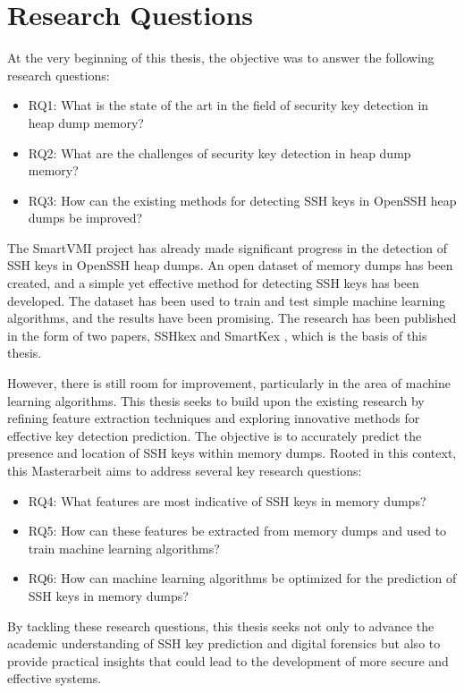 \section{Research Questions}


At the very beginning of this thesis, the objective was to answer the following research questions:
\begin{itemize}
	\item RQ1: What is the state of the art in the field of security key detection in heap dump memory?
	\item RQ2: What are the challenges of security key detection in heap dump memory?
	\item RQ3: How can the existing methods for detecting SSH keys in OpenSSH heap dumps be improved?
\end{itemize}

The SmartVMI project has already made significant progress in the detection of SSH keys in OpenSSH heap dumps. An open dataset of memory dumps has been created, and a simple yet effective method for detecting SSH keys has been developed. The dataset has been used to train and test simple machine learning algorithms, and the results have been promising. The research has been published in the form of two papers, SSHkex \cite{SSHkex22} and SmartKex \cite{SmartKex22}, which is the basis of this thesis. 

However, there is still room for improvement, particularly in the area of machine learning algorithms. This thesis seeks to build upon the existing research by refining feature extraction techniques and exploring innovative methods for effective key detection prediction. The objective is to accurately predict the presence and location of SSH keys within memory dumps. Rooted in this context, this Masterarbeit aims to address several key research questions:

\begin{itemize}
	\item RQ4: What features are most indicative of SSH keys in memory dumps?
	\item RQ5: How can these features be extracted from memory dumps and used to train machine learning algorithms?
	\item RQ6: How can machine learning algorithms be optimized for the prediction of SSH keys in memory dumps? 
\end{itemize}

By tackling these research questions, this thesis seeks not only to advance the academic understanding of SSH key prediction and digital forensics but also to provide practical insights that could lead to the development of more secure and effective systems.

